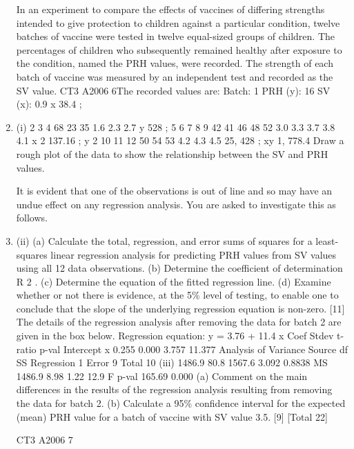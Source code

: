 \documentclass[a4paper,12pt]{article}
\begin{document}
\begin{enumerate}
In an experiment to compare the effects of vaccines of differing strengths intended to give protection to children against a particular condition, twelve batches of vaccine
were tested in twelve equal-sized groups of children. The percentages of children who subsequently remained healthy after exposure to the condition, named the PRH
values, were recorded. The strength of each batch of vaccine was measured by an independent test and recorded as the SV value.
CT3 A2006 6The recorded values are:
Batch:
1
PRH (y): 16
SV (x):
0.9
x 38.4 ;
\item (i)
2
3
4
68 23 35
1.6 2.3 2.7
y
528 ;
5
6
7
8
9
42 41 46 48 52
3.0 3.3 3.7 3.8 4.1
x 2 137.16 ;
y 2
10 11 12
50 54 53
4.2 4.3 4.5
25, 428 ;
xy 1, 778.4
Draw a rough plot of the data to show the relationship between the SV and PRH values.

It is evident that one of the observations is out of line and so may have an undue effect on any regression analysis. You are asked to investigate this as follows.
\item (ii)
(a) Calculate the total, regression, and error sums of squares for a least-
squares linear regression analysis for predicting PRH values from SV
values using all 12 data observations.
(b) Determine the coefficient of determination R 2 .
(c) Determine the equation of the fitted regression line.
(d) Examine whether or not there is evidence, at the 5\% level of testing, to enable one to conclude that the slope of the underlying regression
equation is non-zero.
[11]
The details of the regression analysis after removing the data for batch 2 are given in
the box below.
Regression equation: y = 3.76 + 11.4 x
Coef
Stdev
t-ratio p-val
Intercept
x 0.255
0.000
3.757
11.377
Analysis of Variance
Source
df
SS
Regression 1
Error
9
Total
10
(iii)
1486.9
80.8
1567.6
3.092
0.8838
MS
1486.9
8.98
1.22
12.9
F p-val
165.69 0.000
(a) Comment on the main differences in the results of the regression
analysis resulting from removing the data for batch 2.
(b) Calculate a 95\% confidence interval for the expected (mean) PRH
value for a batch of vaccine with SV value 3.5.
[9]
[Total 22]

CT3 A2006 7

\newpage


\end{enumerate}
\end{document}
